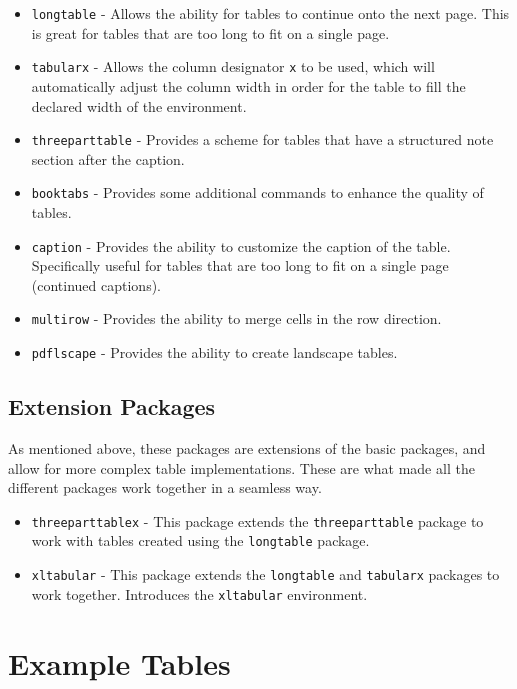 \begin{itemize}
    \item \texttt{longtable} - Allows the ability for tables to continue onto the next page. This is great for tables that are too long to fit on a single page.
    \item \texttt{tabularx} - Allows the column designator \texttt{x} to be used, which will automatically adjust the column width in order for the table to fill the declared width of the environment.
    \item \texttt{threeparttable} - Provides a scheme for tables that have a structured note section after the caption.
    \item \texttt{booktabs} - Provides some additional commands to enhance the quality of tables.
    \item \texttt{caption} - Provides the ability to customize the caption of the table. Specifically useful for tables that are too long to fit on a single page (continued captions).
    \item \texttt{multirow} - Provides the ability to merge cells in the row direction.
    \item \texttt{pdflscape} - Provides the ability to create landscape tables.
\end{itemize}

\subsection{Extension Packages}
\label{sec:tables-extension-packages}

As mentioned above, these packages are extensions of the basic packages, and allow for more complex table implementations. These are what made all the different packages work together in a seamless way.

\begin{itemize}
    \item \texttt{threeparttablex} - This package extends the \texttt{threeparttable} package to work with tables created using the \texttt{longtable} package.
    \item \texttt{xltabular} - This package extends the \texttt{longtable} and \texttt{tabularx} packages to work together. Introduces the \texttt{xltabular} environment.
\end{itemize}

\section{Example Tables}
\label{sec:tables-example}

